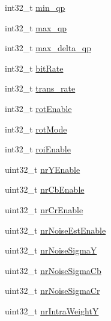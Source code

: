 \begin{DoxyCompactItemize}
int32\+\_\+t \mbox{\hyperlink{struct__ni__encoder__change__params__t_ac8af7a54d7a621be72a85fa49e2d5438}{min\+\_\+qp}}
\item 
int32\+\_\+t \mbox{\hyperlink{struct__ni__encoder__change__params__t_ae4e8d31eb2e24cd33744fa0f780f9645}{max\+\_\+qp}}
\item 
int32\+\_\+t \mbox{\hyperlink{struct__ni__encoder__change__params__t_a8f44c3ec7a96e9c82494a7bc6d615cd6}{max\+\_\+delta\+\_\+qp}}
\item 
int32\+\_\+t \mbox{\hyperlink{struct__ni__encoder__change__params__t_a1e9179bd74ecf129be3126eedf45f06e}{bit\+Rate}}
\item 
int32\+\_\+t \mbox{\hyperlink{struct__ni__encoder__change__params__t_a46a8c1fc16c87e1f8cacbe1d0ab57786}{trans\+\_\+rate}}
\item 
int32\+\_\+t \mbox{\hyperlink{struct__ni__encoder__change__params__t_a5cc158e477c33fa8845b726beae7dec2}{rot\+Enable}}
\item 
int32\+\_\+t \mbox{\hyperlink{struct__ni__encoder__change__params__t_a16a13e99f9ec540de7fcd4d172088bd9}{rot\+Mode}}
\item 
int32\+\_\+t \mbox{\hyperlink{struct__ni__encoder__change__params__t_af75c3567740c6fbc3baa8c4c72fd0df7}{roi\+Enable}}
\item 
uint32\+\_\+t \mbox{\hyperlink{struct__ni__encoder__change__params__t_a98953814185368ffca54fd85f3b37c85}{nr\+Y\+Enable}}
\item 
uint32\+\_\+t \mbox{\hyperlink{struct__ni__encoder__change__params__t_a556db0011f8c283748d38093092c1563}{nr\+Cb\+Enable}}
\item 
uint32\+\_\+t \mbox{\hyperlink{struct__ni__encoder__change__params__t_acee109a61abe6ce43c63c7924e42b2da}{nr\+Cr\+Enable}}
\item 
uint32\+\_\+t \mbox{\hyperlink{struct__ni__encoder__change__params__t_a7bac97c4d1967ed8c31034e3c402e31f}{nr\+Noise\+Est\+Enable}}
\item 
uint32\+\_\+t \mbox{\hyperlink{struct__ni__encoder__change__params__t_a56f22b5e6fafd5a1e4020b03324ba78d}{nr\+Noise\+SigmaY}}
\item 
uint32\+\_\+t \mbox{\hyperlink{struct__ni__encoder__change__params__t_a551fcc5ea682e36c1fe82833645cbeba}{nr\+Noise\+Sigma\+Cb}}
\item 
uint32\+\_\+t \mbox{\hyperlink{struct__ni__encoder__change__params__t_a273b9f2be635c0d0531f0f5cb224bc04}{nr\+Noise\+Sigma\+Cr}}
\item 
uint32\+\_\+t \mbox{\hyperlink{struct__ni__encoder__change__params__t_ac74e34b49c74dc5c5b039df43a2d6fff}{nr\+Intra\+WeightY}}

\end{DoxyCompactItemize}
